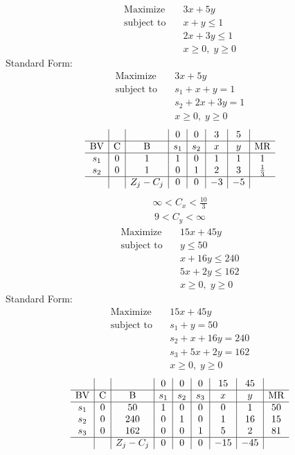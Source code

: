 \documentclass{article}
\begin{document}
\begin{align*}
\text{Maximize} \quad & 3x + 5y\\
\text{subject to} \quad
& x + y\le1\\
& 2x + 3y\le1\\
& x\ge0,\; y\ge0\end{align*}
Standard Form:\\
\begin{align*}
\text{Maximize} \quad & 3x + 5y\\
\text{subject to} \quad
& s_{1} + x + y=1\\
& s_{2} + 2x + 3y=1\\
& x\ge0,\; y\ge0\end{align*}
\begin{align*}
\begin{array}{c|c|c|c|c|c|c|c}
 &  &  & 0 & 0 & 3 & 5 & \\
\hline
\text{BV} & \text{C} & \text{B} & s_{1} & s_{2} & x & y & \text{MR} \\
\hline
s_{1} & 0 & 1 & 1 & 0 & 1 & 1 & 1 \\
s_{2} & 0 & 1 & 0 & 1 & 2 & 3 & \frac{1}{3} \\
\hline
 &  & Z_j-C_j & 0 & 0 & -3 & -5 & \\
\end{array}
\end{align*}
\begin{align*}
\infty<C_{x}<\frac{10}{3}\end{align*}
\begin{align*}
9<C_{y}<\infty\end{align*}
\begin{align*}
\text{Maximize} \quad & 15x + 45y\\
\text{subject to} \quad
& y\le50\\
& x + 16y\le240\\
& 5x + 2y\le162\\
& x\ge0,\; y\ge0\end{align*}
Standard Form:\\
\begin{align*}
\text{Maximize} \quad & 15x + 45y\\
\text{subject to} \quad
& s_{1} + y=50\\
& s_{2} + x + 16y=240\\
& s_{3} + 5x + 2y=162\\
& x\ge0,\; y\ge0\end{align*}
\begin{align*}
\begin{array}{c|c|c|c|c|c|c|c|c}
 &  &  & 0 & 0 & 0 & 15 & 45 & \\
\hline
\text{BV} & \text{C} & \text{B} & s_{1} & s_{2} & s_{3} & x & y & \text{MR} \\
\hline
s_{1} & 0 & 50 & 1 & 0 & 0 & 0 & 1 & 50 \\
s_{2} & 0 & 240 & 0 & 1 & 0 & 1 & 16 & 15 \\
s_{3} & 0 & 162 & 0 & 0 & 1 & 5 & 2 & 81 \\
\hline
 &  & Z_j-C_j & 0 & 0 & 0 & -15 & -45 & \\
\end{array}
\end{align*}
\end{document}
